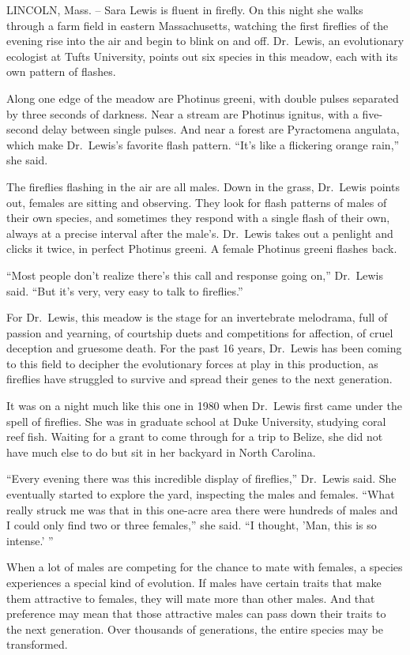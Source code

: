 ﻿\documentclass[12pt]{article}
\begin{document}
LINCOLN, Mass. -- Sara Lewis is fluent in firefly. On this night she walks through a farm field in
eastern Massachusetts, watching the first fireflies of the evening rise into the air and begin to
blink on and off. Dr.~Lewis, an evolutionary ecologist at Tufts University, points out six species
in this meadow, each with its own pattern of flashes.

Along one edge of the meadow are Photinus greeni, with double pulses separated by three seconds of
darkness. Near a stream are Photinus ignitus, with a five-second delay between single pulses. And
near a forest are Pyractomena angulata, which make Dr.~Lewis's favorite flash pattern. ``It's like a
flickering orange rain,'' she said.

The fireflies flashing in the air are all males. Down in the grass, Dr.~Lewis points out, females
are sitting and observing. They look for flash patterns of males of their own species, and sometimes
they respond with a single flash of their own, always at a precise interval after the male's.
Dr.~Lewis takes out a penlight and clicks it twice, in perfect Photinus greeni. A female Photinus
greeni flashes back.

``Most people don't realize there's this call and response going on,'' Dr.~Lewis said. ``But it's
very, very easy to talk to fireflies.''

For Dr.~Lewis, this meadow is the stage for an invertebrate melodrama, full of passion and yearning,
of courtship duets and competitions for affection, of cruel deception and gruesome death. For the
past 16 years, Dr.~Lewis has been coming to this field to decipher the evolutionary forces at play
in this production, as fireflies have struggled to survive and spread their genes to the next
generation.

It was on a night much like this one in 1980 when Dr.~Lewis first came under the spell of fireflies.
She was in graduate school at Duke University, studying coral reef fish. Waiting for a grant to come
through for a trip to Belize, she did not have much else to do but sit in her backyard in North
Carolina.

``Every evening there was this incredible display of fireflies,'' Dr.~Lewis said. She eventually
started to explore the yard, inspecting the males and females. ``What really struck me was that in
this one-acre area there were hundreds of males and I could only find two or three females,'' she
said. ``I thought, 'Man, this is so intense.' ''

When a lot of males are competing for the chance to mate with females, a species experiences a
special kind of evolution. If males have certain traits that make them attractive to females, they
will mate more than other males. And that preference may mean that those attractive males can pass
down their traits to the next generation. Over thousands of generations, the entire species may be
transformed.
\end{document}
